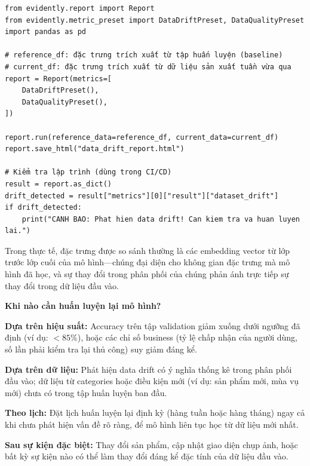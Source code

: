 \begin{verbatim}
from evidently.report import Report
from evidently.metric_preset import DataDriftPreset, DataQualityPreset
import pandas as pd

# reference_df: đặc trưng trích xuất từ tập huấn luyện (baseline)
# current_df: đặc trưng trích xuất từ dữ liệu sản xuất tuần vừa qua
report = Report(metrics=[
    DataDriftPreset(),
    DataQualityPreset(),
])

report.run(reference_data=reference_df, current_data=current_df)
report.save_html("data_drift_report.html")

# Kiểm tra lập trình (dùng trong CI/CD)
result = report.as_dict()
drift_detected = result["metrics"][0]["result"]["dataset_drift"]
if drift_detected:
    print("CANH BAO: Phat hien data drift! Can kiem tra va huan luyen lai.")
\end{verbatim}

Trong thực tế, đặc trưng được so sánh thường là các embedding vector từ lớp trước lớp cuối của mô hình---chúng đại diện cho không gian đặc trưng mà mô hình đã học, và sự thay đổi trong phân phối của chúng phản ánh trực tiếp sự thay đổi trong dữ liệu đầu vào.

\begin{mdframed}[style=infobox]
\textbf{Khi nào cần huấn luyện lại mô hình?}

\textbf{Dựa trên hiệu suất:} Accuracy trên tập validation giảm xuống dưới ngưỡng đã định (ví dụ: $< 85\%$), hoặc các chỉ số business (tỷ lệ chấp nhận của người dùng, số lần phải kiểm tra lại thủ công) suy giảm đáng kể.

\textbf{Dựa trên dữ liệu:} Phát hiện data drift có ý nghĩa thống kê trong phân phối đầu vào; dữ liệu từ categories hoặc điều kiện mới (ví dụ: sản phẩm mới, mùa vụ mới) chưa có trong tập huấn luyện ban đầu.

\textbf{Theo lịch:} Đặt lịch huấn luyện lại định kỳ (hàng tuần hoặc hàng tháng) ngay cả khi chưa phát hiện vấn đề rõ ràng, để mô hình liên tục học từ dữ liệu mới nhất.

\textbf{Sau sự kiện đặc biệt:} Thay đổi sản phẩm, cập nhật giao diện chụp ảnh, hoặc bất kỳ sự kiện nào có thể làm thay đổi đáng kể đặc tính của dữ liệu đầu vào.
\end{mdframed}
